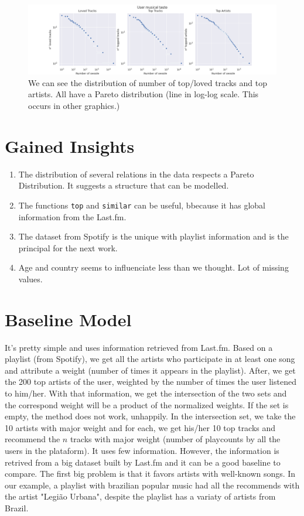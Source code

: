 \documentclass{article}
\begin{document}
\begin{figure}[!h]
  \centering
  \label{fig:top-loved}
  \includegraphics[width = \textwidth]{../../images/top-loved-tracks.png}
  \caption{We can see the distribution of number of top/loved tracks and top artists. All have a Pareto distribution (line in log-log scale. This occurs in other graphics.)}
\end{figure}

\section{Gained Insights}

\begin{enumerate}
  \item The distribution of several relations in the data respects a Pareto
  Distribution. It suggests a structure that can be modelled. 
  \item The functions \lstinline{top} and \lstinline{similar} can be useful,
  bbecause it has global information from the Last.fm. 
  \item The dataset from Spotify is the unique with playlist information and
  is the principal for the next work. 
  \item Age and country seems to influenciate less than we thought. Lot of
  missing values.  
\end{enumerate}

\section{Baseline Model}

It's pretty simple and uses information retrieved from Last.fm. Based on a
playlist (from Spotify), we get all the artists who participate in at least
one song and attribute a weight (number of times it appears in the playlist). After, we get the 200 top artists of the user, weighted by the number of
times the user listened to him/her. With that information, we get the
intersection of the two sets and the correspond weight will be a product of
the normalized weights. If the set is empty, the method does not work, unhappily.
In the intersection set, we take the 10 artists with major weight and for each,
we get his/her 10 top tracks and recommend the $n$ tracks with major weight
(number of playcounts by all the users in the plataform). It uses few information. However, the information is
retrived from a big dataset built by Last.fm and it can be a good baseline to
compare. The first big problem is that it favors artists with well-known
songs. In our example, a playlist with brazilian popular music had all the
recommends with the artist "Legião Urbana", despite the playlist has a variaty
of artists from Brazil. 
\end{document}
